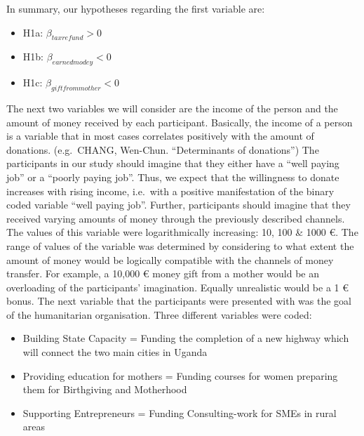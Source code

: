 \documentclass[
  12pt,
]{article}
\providecommand{\tightlist}{%
  \setlength{\itemsep}{0pt}\setlength{\parskip}{0pt}}
\begin{document}
In summary, our hypotheses regarding the first variable are:

\begin{itemize}
\tightlist
\item
  H1a: \(\beta_{taxrefund} > 0\)
\item
  H1b: \(\beta_{earnedmodey} < 0\)
\item
  H1c: \(\beta_{giftfrommother} < 0\)
\end{itemize}

The next two variables we will consider are the income of the person and
the amount of money received by each participant. Basically, the income
of a person is a variable that in most cases correlates positively with
the amount of donations. (e.g.~CHANG, Wen-Chun. ``Determinants of
donations'') The participants in our study should imagine that they
either have a ``well paying job'' or a ``poorly paying job''. Thus, we
expect that the willingness to donate increases with rising income,
i.e.~with a positive manifestation of the binary coded variable ``well
paying job''. Further, participants should imagine that they received
varying amounts of money through the previously described channels. The
values of this variable were logarithmically increasing: 10, 100 \& 1000
€. The range of values of the variable was determined by considering to
what extent the amount of money would be logically compatible with the
channels of money transfer. For example, a 10,000 € money gift from a
mother would be an overloading of the participants' imagination. Equally
unrealistic would be a 1 € bonus. The next variable that the
participants were presented with was the goal of the humanitarian
organisation. Three different variables were coded:

\begin{itemize}
\item
  Building State Capacity = Funding the completion of a new highway
  which will connect the two main cities in Uganda
\item
  Providing education for mothers = Funding courses for women preparing
  them for Birthgiving and Motherhood
\item
  Supporting Entrepreneurs = Funding Consulting-work for SMEs in rural
  areas
\end{itemize}
\end{document}
